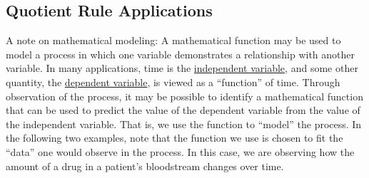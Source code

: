 \subsection*{Quotient Rule Applications}
A note on mathematical modeling:  A mathematical function may be used to model a process in which one variable demonstrates a relationship with another variable.  In many applications, time is the \underline{independent variable}, and some other quantity, the \underline{dependent variable}, is viewed as a “function” of time.  Through observation of the process, it may be possible to identify a mathematical function that can be used to predict the value of the dependent variable from the value of the independent variable.  That is, we use the function to “model” the process.  In the following two examples, note that the function we use is chosen to fit the “data” one would observe in the process.  In this case, we are observing how the amount of a drug in a patient’s bloodstream changes over time.
\newpage
